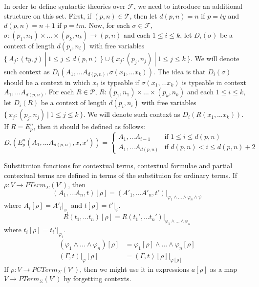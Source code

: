 \documentclass[reqno]{amsart}
\theoremstyle{definition}
\theoremstyle{remark}
\numberwithin{figure}{section}
\begin{document}
In order to define syntactic theories over $\mathcal{F}$, we need to introduce an additional structure on this set.
First, if $(p,n) \in \mathcal{T}$, then let $d(p,n) = n$ if $p = ty$ and $d(p,n) = n+1$ if $p = tm$.
Now, for each $\sigma \in \mathcal{F}$, $\sigma : (p_1,n_1) \times \ldots \times (p_k,n_k) \to (p,n)$ and each $1 \leq i \leq k$,
let $D_i(\sigma)$ be a context of length $d(p_i,n_i)$ with free variables $\{\ A_j : (ty,j)\ |\ 1 \leq j \leq d(p,n)\ \} \cup \{\ x_j : (p_j,n_j)\ |\ 1 \leq j \leq k\ \}$.
We will denote such context as $D_i(A_1, \ldots A_{d(p,n)}, \sigma(x_1, \ldots x_k))$.
The idea is that $D_i(\sigma)$ should be a context in which $x_i$ is typeable if $\sigma(x_1, \ldots x_k)$ is typeable in context $A_1, \ldots A_{d(p,n)}$.
For each $R \in \mathcal{P}$, $R : (p_1,n_1) \times \ldots \times (p_k,n_k)$ and each $1 \leq i \leq k$,
let $D_i(R)$ be a context of length $d(p_i,n_i)$ with free variables $\{\ x_j : (p_j,n_j)\ |\ 1 \leq j \leq k\ \}$.
We will denote such context as $D_i(R(x_1, \ldots x_k))$.
If $R = E^n_p$, then it should be defined as follows:
\[ D_i(E^n_p(A_1, \ldots A_{d(p,n)}, x, x')) =
  \begin{cases}
      A_1, \ldots A_{i-1} & \text{if } 1 \leq i \leq d(p,n) \\
      A_1, \ldots A_{d(p,n)} & \text{if } d(p,n) < i \leq d(p,n) + 2
  \end{cases}
\]

Substitution functions for contextual terms, contextual formulae and partial contextual terms are defined in terms of the substituion for ordinary terms.
If $\rho : V \to PTerm_\Sigma(V')$, then
\[ (A_1, \ldots A_n, t)[\rho] = (A'_1, \ldots A'_n, t')|_{\varphi_1 \land \ldots \land \varphi_n \land \psi} \]
where $A_i[\rho] = A'_i|_{\varphi_i}$ and $t[\rho] = t'|_\psi$.
\[ R(t_1, \ldots t_n)[\rho] = R(t_1', \ldots t_n')|_{\varphi_1 \land \ldots \land \varphi_n} \]
where $t_i[\rho] = t_i'|_{\varphi_i}$.
\begin{align*}
(\varphi_1 \land \ldots \land \varphi_n)[\rho] & = \varphi_1[\rho] \land \ldots \land \varphi_n[\rho] \\
(\Gamma,t)|_\varphi[\rho] & = (\Gamma,t)[\rho]|_{\varphi[\rho]}
\end{align*}
If $\rho : V \to PCTerm_\Sigma(V')$, then we might use it in expressions $a[\rho]$ as a map $V \to PTerm_\Sigma(V')$ by forgetting contexts.
\end{document}
